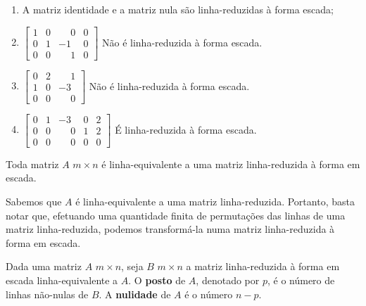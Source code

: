 \begin{exemplo}
\begin{enumerate}
	\item  A matriz identidade e a matriz nula s\~ao linha-reduzidas \`a forma escada;
	\item $\begin{bmatrix}
	1 & 0 & \phantom{-}0 & 0\\
	0 & 1 & -1 & 0\\
	0 & 0 & \phantom{-}1 & 0
	\end{bmatrix}$ N\~ao \'e linha-reduzida \`a forma escada.
	\item $\begin{bmatrix}
	0 & 2 & \phantom{-}1\\
	1 & 0 & -3\\
	0 & 0 & \phantom{-}0
	\end{bmatrix}$ N\~ao \'e linha-reduzida \`a forma escada.
	\item $\begin{bmatrix}
	0 & 1 & -3 & 0 & 2\\
	0 & 0 & \phantom{-}0 & 1 & 2\\
	0 & 0 & \phantom{-}0 & 0 & 0
	\end{bmatrix}$ \'E linha-reduzida \`a forma escada.
\end{enumerate}
\end{exemplo}

\begin{teorema}
Toda matriz $A$ $m \times n$ \'e linha-equivalente a uma matriz linha-reduzida \`a forma em escada.
\end{teorema}
\begin{prova}
Sabemos que $A$ \'e linha-equivalente a uma matriz linha-reduzida. Portanto, basta notar que, efetuando uma quantidade finita de permuta\c{c}\~oes das linhas de uma matriz linha-reduzida, podemos transform\'a-la numa matriz linha-reduzida \`a forma em escada.
\end{prova}

\begin{definicao}
Dada uma matriz $A$ $m \times n$, seja $B$ $m \times n$ a matriz linha-reduzida \`a forma em escada linha-equivalente a $A$. O \textbf{posto} de $A$, denotado por $p$, \'e o n\'umero de linhas n\~ao-nulas de $B$. A \textbf{nulidade} de $A$ \'e o n\'umero $n - p$.
\end{definicao}


